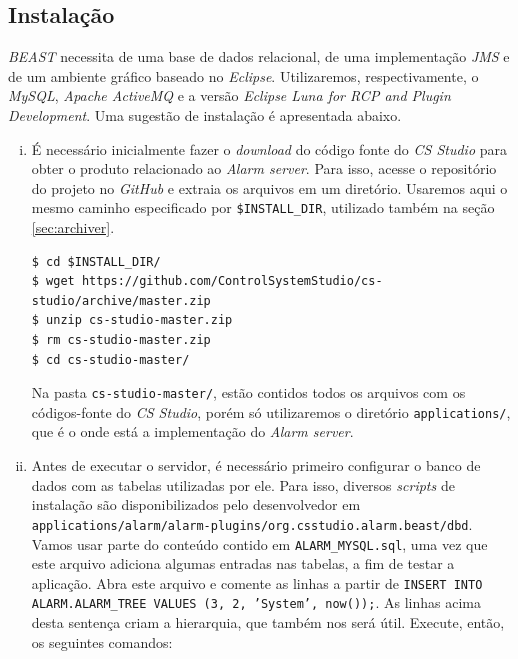 \subsection{Instalação}

\textit{BEAST} necessita de uma base de dados relacional, de uma implementação
\textit{JMS} e de um ambiente gráfico baseado no \textit{Eclipse}. Utilizaremos,
respectivamente, o \textit{MySQL}, \textit{Apache ActiveMQ} e a versão
\textit{Eclipse Luna for RCP and Plugin Development}. Uma sugestão de instalação
é apresentada abaixo.

\begin{enumerate}[i.]
  \item  É necessário inicialmente fazer o \textit{download} do
  código fonte do \textit{CS Studio} para obter o produto relacionado ao \textit{Alarm server}.
  Para isso, acesse o repositório do projeto no \textit{GitHub} e extraia os
  arquivos em um diretório. Usaremos aqui o mesmo caminho especificado por
  \texttt{\$INSTALL\_DIR}, utilizado também na seção \ref{sec:archiver}.
  
  \begin{lstlisting}[keywordstyle=\ttfamily, style=nonumbers]
$ cd $INSTALL_DIR/
$ wget https://github.com/ControlSystemStudio/cs-studio/archive/master.zip
$ unzip cs-studio-master.zip
$ rm cs-studio-master.zip
$ cd cs-studio-master/
\end{lstlisting}
   
   Na pasta \texttt{cs-studio-master/}, estão contidos todos os arquivos com os
   códigos-fonte do \textit{CS Studio}, porém só utilizaremos o diretório \texttt{applications/},
   que é o onde está a implementação do \textit{Alarm server}.
   
   \item \label{mysql-alarm} Antes de executar o servidor, é necessário primeiro
   configurar o banco de dados com as tabelas utilizadas por ele. Para isso, diversos
   \textit{scripts} de instalação são disponibilizados pelo desenvolvedor em 
   \texttt{applications/alarm/alarm-plugins/org.csstudio.alarm.beast/dbd}. Vamos
   usar parte do conteúdo contido em \texttt{ALARM\_MYSQL.sql}, uma vez que
   este arquivo adiciona algumas entradas nas tabelas, a fim de testar a
   aplicação. Abra este arquivo e comente as linhas a partir de \texttt{INSERT
   INTO ALARM.ALARM\_TREE VALUES (3, 2, 'System', now());}. As linhas acima
   desta sentença criam a hierarquia, que também nos será útil. Execute, então,
   os seguintes comandos:
   

\end{enumerate}
